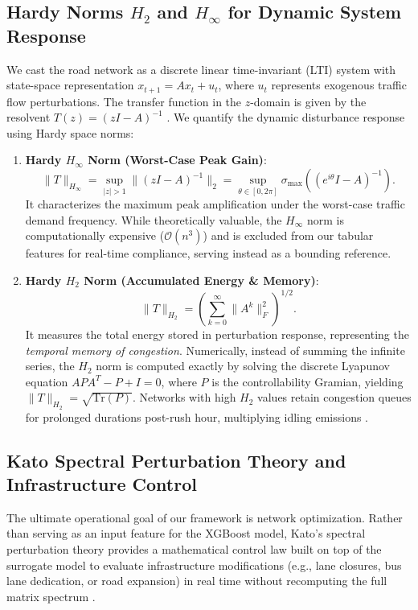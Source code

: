 \documentclass[lettersize,journal]{IEEEtran}
\begin{document}
\subsection{Hardy Norms $H_2$ and $H_\infty$ for Dynamic System Response}
We cast the road network as a discrete linear time-invariant (LTI) system with state-space representation $x_{t+1} = A x_t + u_t$, where $u_t$ represents exogenous traffic flow perturbations. The transfer function in the $z$-domain is given by the resolvent $T(z) = (zI - A)^{-1}$ \cite{Zhou1996}. We quantify the dynamic disturbance response using Hardy space norms:
\begin{enumerate}
    \item \textbf{Hardy $H_\infty$ Norm (Worst-Case Peak Gain)}:
    \begin{equation}
    \|T\|_{H_\infty} = \sup_{|z| > 1} \|(zI - A)^{-1}\|_2 = \sup_{\theta \in [0, 2\pi]} \sigma_{\max}\left( (e^{i\theta}I - A)^{-1} \right).
    \end{equation}
    It characterizes the maximum peak amplification under the worst-case traffic demand frequency. While theoretically valuable, the $H_\infty$ norm is computationally expensive ($\mathcal{O}(n^3)$) and is excluded from our tabular features for real-time compliance, serving instead as a bounding reference.
    \item \textbf{Hardy $H_2$ Norm (Accumulated Energy \& Memory)}:
    \begin{equation}
    \|T\|_{H_2} = \left( \sum_{k=0}^{\infty} \| A^k \|_F^2 \right)^{1/2}.
    \end{equation}
    It measures the total energy stored in perturbation response, representing the \emph{temporal memory of congestion}. Numerically, instead of summing the infinite series, the $H_2$ norm is computed exactly by solving the discrete Lyapunov equation $A P A^T - P + I = 0$, where $P$ is the controllability Gramian, yielding $\|T\|_{H_2} = \sqrt{\text{Tr}(P)}$. Networks with high $H_2$ values retain congestion queues for prolonged durations post-rush hour, multiplying idling emissions \cite{Doyle1989}.
\end{enumerate}

\subsection{Kato Spectral Perturbation Theory and Infrastructure Control}
The ultimate operational goal of our framework is network optimization. Rather than serving as an input feature for the XGBoost model, Kato's spectral perturbation theory provides a mathematical control law built on top of the surrogate model to evaluate infrastructure modifications (e.g., lane closures, bus lane dedication, or road expansion) in real time without recomputing the full matrix spectrum \cite{Kato1995}.
\end{document}
